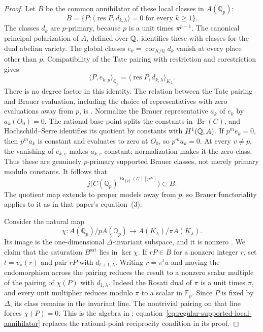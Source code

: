 \begin{proof}
Let $B$ be the common annihilator of these local classes in
$A(\mathbb Q_p)$:
\[
 B=\{P:\langle\operatorname{res}P,d_{k,\lambda}\rangle=0
                     \text{ for every }k\ge1\}.
\]
The classes $d_k$ are $p$-primary, because $p$ is a unit times
$\pi^{p-1}$. The canonical principal polarization of $A$, defined
 over $\mathbb Q$, identifies these with classes for the dual abelian variety.
The global classes $e_k=\operatorname{cor}_{K/\mathbb Q}d_k$
vanish at every place other than $p$.  Compatibility of the Tate
pairing with restriction and corestriction gives
\[
 \langle P,e_{k,p}\rangle_{\mathbb Q_p}
       =\langle\operatorname{res}P,d_{k,\lambda}\rangle_{K_\lambda}.
\]
There is no degree factor in this identity.  The relation between
the Tate pairing and Brauer evaluation, including the choice of
representatives with zero evaluations away from $p$, is
\citet[Lemma~1 and equation~(5), author pp.~4--5]{McCallum2001Brauer}.
Normalize the Brauer representative $a_k$ of $e_k$ by
$a_k(O_0)=0$. The rational base point splits the constants in
$\operatorname{Br}(C)$, and Hochschild--Serre identifies its quotient
by constants with $H^1(\mathbb Q,A)$. If $p^me_k=0$, then $p^ma_k$ is
constant and evaluates to zero at $O_0$, so $p^ma_k=0$. At every
$v\ne p$, the vanishing of $e_{k,v}$ makes $a_{k,v}$ constant;
normalization makes it the zero class. Thus these are genuinely
$p$-primary supported Brauer classes, not merely primary modulo constants.
It follows that
\begin{equation}\label{eq:regular-supported-local-annihilator}
 j\bigl(C(\mathbb Q_p)^{\operatorname{Br}_{\{p\}}(\mathcal C)[p^\infty]}\bigr)
       \subset B.
\end{equation}
The quotient map extends to proper models away from $p$, so Brauer
functoriality applies to it as in that paper's equation~(3).

Consider the natural map
\[
 \chi:A(\mathbb Q_p)/pA(\mathbb Q_p)
                \longrightarrow A(K_\lambda)/\pi A(K_\lambda).
\]
Its image is the one-dimensional $\Delta$-invariant subspace,
and it is nonzero
\citep[Corollary~2 and Proposition~5, pp.~574--575]{McCallum1994}.
We claim that the saturation $B^{\mathrm{sat}}$ lies in
$\ker\chi$.  If $rP\in B$ for a nonzero integer $r$, set
$t=v_\pi(r)$ and pair $rP$ with $d_{t+1,\lambda}$.
Writing $r=\pi^tu$ and moving the endomorphism across the pairing
reduces the result to a nonzero scalar multiple of the pairing
of $\chi(P)$ with $d_{1,\lambda}$.  Indeed the Rosati dual of
$\pi$ is a unit times $\pi$, and every unit multiplier reduces
modulo $\pi$ to a scalar in $\mathbb F_p$.
Since $P$ is fixed by $\Delta$, its class remains in the invariant
line.  The nontrivial pairing on that line forces $\chi(P)=0$.
This is the algebra in
\citet[Theorem~3, pp.~575--576]{McCallum1994}; equation~\eqref{eq:regular-supported-local-annihilator}
replaces the rational-point reciprocity condition in its proof.


\end{proof}
